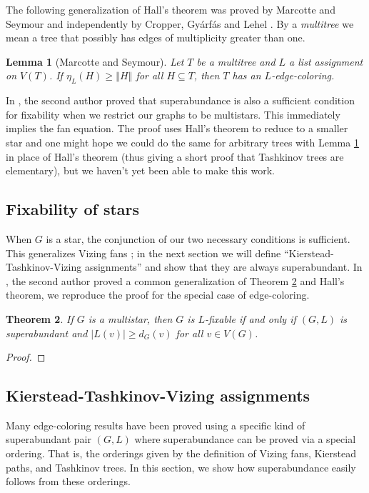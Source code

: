 \documentclass[12pt]{article}
\theoremstyle{plain}
\newtheorem{thm}{Theorem}[section]
\newtheorem{lem}[thm]{Lemma}
\theoremstyle{definition}
\theoremstyle{remark}
\newcommand{\size}[1]{\left\Vert#1\right\Vert}
\begin{document}
The following generalization of Hall's theorem was proved by Marcotte and Seymour \cite{marcotte1990extending} and independently by Cropper, Gy{\'a}rf{\'a}s and Lehel \cite{cropper2003edge}.  By a \emph{multitree} we mean a tree that possibly has edges of multiplicity greater than one.

\begin{lem}[Marcotte and Seymour]\label{MultiTreeHall}
Let $T$ be a multitree and $L$ a list assignment on $V(T)$.  If $\eta_L(H) \ge \size{H}$ for all $H \subseteq T$, then $T$ has an $L$-edge-coloring.
\end{lem}

In \cite{HallGame}, the second author proved that superabundance is also a sufficient condition for fixability when we restrict our graphs to be multistars.  This immediately implies the fan equation.  The proof uses Hall's theorem to reduce to a smaller star and one might hope we could do the same for arbitrary trees with Lemma \ref{MultiTreeHall} in place of Hall's theorem (thus giving a short proof that Tashkinov trees are elementary), but we haven't yet been able to make this work.

\subsection{Fixability of stars}
When $G$ is a star, the conjunction of our two necessary conditions is sufficient. This generalizes Vizing fans \cite{Vizing76}; in the next section we will define ``Kierstead-Tashkinov-Vizing assignments'' and show that they are always superabundant.  In \cite{HallGame}, the second author proved a common generalization of Theorem \ref{FixabilityOfStars} and Hall's theorem, we reproduce the proof for the special case of edge-coloring.

\begin{thm}\label{FixabilityOfStars}
If $G$ is a multistar, then $G$ is $L$-fixable if and only if $(G, L)$ is superabundant and $|L(v)| \ge d_G(v)$ for all $v \in V(G)$.
\end{thm}
\begin{proof}
\end{proof}

\subsection{Kierstead-Tashkinov-Vizing assignments}
Many edge-coloring results have been proved using a specific kind of
superabundant pair $(G, L)$ where superabundance can be proved via a special
ordering. That is, the orderings given by the definition of Vizing fans,
Kierstead paths, and Tashkinov trees.  In this section, we show how
superabundance easily follows from these orderings.
\end{document}
